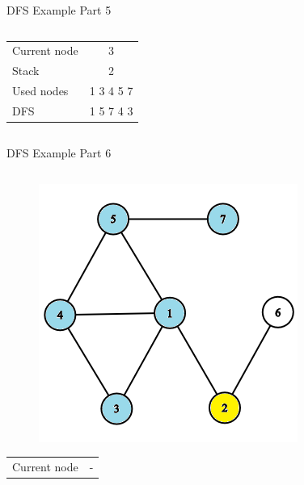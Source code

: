 \documentclass[aspectratio=169]{beamer}%
\begin{document}
\begin{frame}{DFS Example Part 5}
\begin{columns}
\begin{column}{0.32\textwidth}
\begin{figure}[!ht]
            \end{figure}
            \begin{table}[ht]
                \centering
                \begin{tabular}{l c}
                    Current node & 3\\
                    Stack & 2\\ 
                    Used nodes & 1 3 4 5 7\\
                    DFS & 1 5 7 4 3 
                \end{tabular}
            \end{table}
        \end{column}
    \end{columns}
\end{frame}

\begin{frame}{DFS Example Part 6}
    \begin{columns}
        \begin{column}{0.32\textwidth}
            \begin{figure}[!ht]
                \centering
                \includegraphics[width=0.9\linewidth]{dfs 16.png}
            \end{figure}
            \begin{table}[ht]
                \centering
                \begin{tabular}{l c}
                    Current node & -\\

\end{tabular}
\end{table}
\end{column}
\end{columns}
\end{frame}
\end{document}
